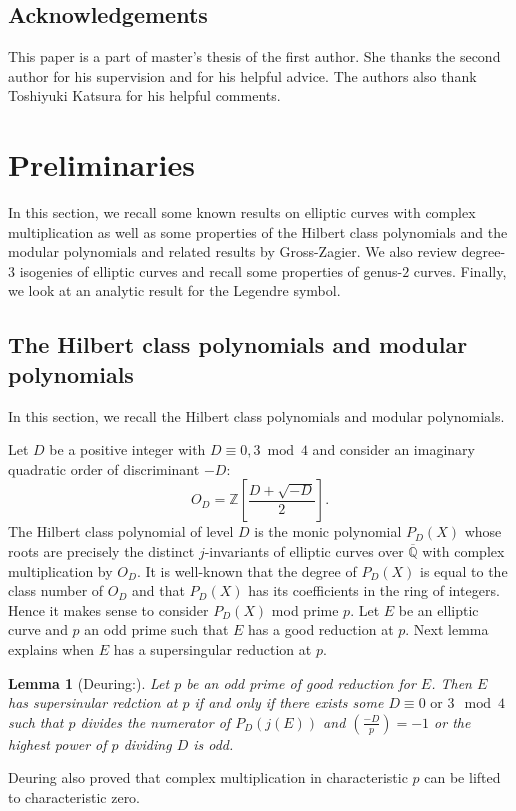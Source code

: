 \documentclass[a4paper, 11pt]{article}
\theoremstyle{plain}
\newtheorem{lem}[defn]{Lemma}
\newcommand{\?}{\textcolor{red}{??}}
\newcommand{\bQ}{\mathbb{Q}}
\newcommand{\bZ}{\mathbb{Z}}
\begin{document}

\subsection*{Acknowledgements}
This paper is a part of master’s thesis of the first author. She thanks
the second author for his supervision and for his helpful advice.  The authors also thank Toshiyuki Katsura for his helpful comments.
 
\section{Preliminaries}
\label{preliminaries}
In this section, we recall some known results on
elliptic curves with complex multiplication as well as some properties of the Hilbert class polynomials and the modular polynomials and related results by Gross-Zagier. %
We also review degree-$3$ isogenies of elliptic curves %
and recall some properties of genus-$2$ curves. Finally, we look at an analytic result for the Legendre symbol.

\subsection{The Hilbert class polynomials and modular polynomials }
\label{complex}
In this section, we recall the Hilbert class polynomials and modular polynomials.

Let $D$ be a positive integer with $D\equiv0,3 \bmod 4$ and consider an imaginary quadratic order of discriminant $-D$:
\[
O_D=\bZ\left[\frac{D+\sqrt{-D}}{2}\right].
\]
The Hilbert class polynomial of level $D$ is the monic polynomial $P_D(X)$ whose roots are precisely the distinct $j$-invariants of elliptic curves over $\overline{\bQ}$ with complex multiplication by $O_D$. It is well-known that the degree of $P_{D}(X)$ is equal to the class number of $O_D$ and that $P_{D}(X)$ has its coefficients in the ring of integers. Hence it makes sense to consider $P_D(X)$ mod prime $p$. Let $E$ be an elliptic curve and $p$ an odd prime such that $E$ has a good reduction at $p$. Next lemma explains when $E$ has a supersingular reduction at $p$.
\begin{lem}[Deuring:\cite{Deu}]
\label{nonquadraticp}
Let $p$ be an odd prime of good reduction for $E$. Then $E$ has supersinular redction at $p$ if and only if there exists some $D \equiv 0 \textrm{ or }3 \mod 4$ such that 
$p$ divides the numerator of $P_{D}(j(E))$ and $\left(\frac{-D}{p}\right)=-1$ or the highest power of $p$ dividing $D$ is odd. 
\end{lem}
Deuring also proved that complex multiplication in characteristic $p$ 
can be lifted to characteristic zero.
\end{document}
